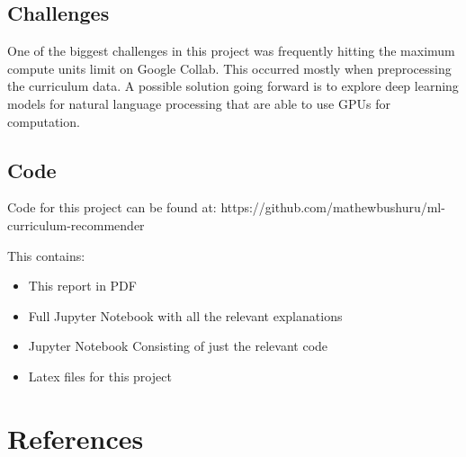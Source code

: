 \documentclass{article}
\begin{document}
\subsection{Challenges} 
One of the biggest challenges in this project was frequently hitting the maximum compute units limit on Google Collab. This occurred mostly when preprocessing the curriculum data. A possible solution going forward is to explore deep learning models for natural language processing that are able to use GPUs for computation. 

\subsection{Code}
Code for this project can be found at: https://github.com/mathewbushuru/ml-curriculum-recommender 

This contains:
\begin{itemize}
    \item This report in PDF
    \item Full Jupyter Notebook with all the relevant explanations
    \item Jupyter Notebook Consisting of just the relevant code
    \item Latex files for this project
\end{itemize}

\section*{References}
\medskip
\end{document}

